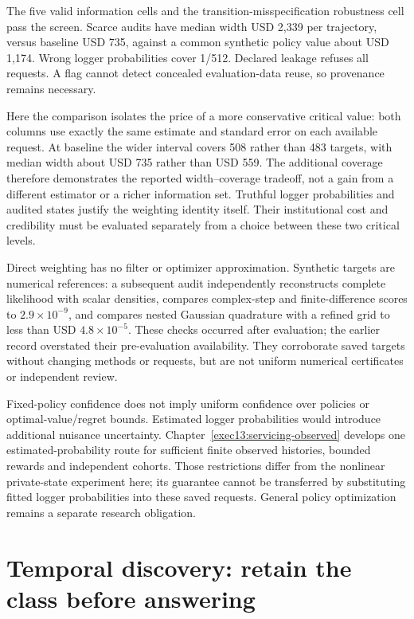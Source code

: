 The five valid information cells and the transition-misspecification robustness cell pass the screen. Scarce audits have median width USD 2,339 per trajectory, versus baseline USD 735, against a common synthetic policy value about USD 1,174. Wrong logger probabilities cover 1/512. Declared leakage refuses all requests. A flag cannot detect concealed evaluation-data reuse, so provenance remains necessary.

Here the comparison isolates the price of a more conservative critical
value: both columns use exactly the same estimate and standard error on
each available request. At baseline the wider interval covers 508 rather
than 483 targets, with median width about USD 735 rather than USD 559.
The additional coverage therefore demonstrates the reported width--coverage
tradeoff, not a gain from a different estimator or a richer information set.
Truthful logger probabilities and audited states justify the weighting
identity itself. Their institutional cost and credibility must be evaluated
separately from a choice between these two critical levels.

Direct weighting has no filter or optimizer approximation. Synthetic targets are numerical references: a subsequent audit independently reconstructs complete likelihood with scalar densities, compares complex-step and finite-difference scores to $2.9\times10^{-9}$, and compares nested Gaussian quadrature with a refined grid to less than USD $4.8\times10^{-5}$. These checks occurred after evaluation; the earlier record overstated their pre-evaluation availability. They corroborate saved targets without changing methods or requests, but are not uniform numerical certificates or independent review.

Fixed-policy confidence does not imply uniform confidence over policies or optimal-value/regret bounds. Estimated logger probabilities would introduce additional nuisance uncertainty. Chapter~\ref{exec13:servicing-observed} develops one estimated-probability route for sufficient finite observed histories, bounded rewards and independent cohorts. Those restrictions differ from the nonlinear private-state experiment here; its guarantee cannot be transferred by substituting fitted logger probabilities into these saved requests. General policy optimization remains a separate research obligation.

\section{Temporal discovery: retain the class before answering}
